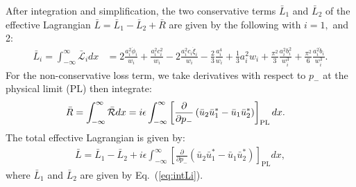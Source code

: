 After integration and simplification, the two conservative terms $\bar{L}_1$ and $\bar{L}_2$ of the effective Lagrangian $\bar{L} = \bar{L}_1 - \bar{L}_2 + \bar{R}$ are given by the following with $i=1,$ and 2:
\begin{align}
\bar{L}_i = \int_{-\infty}^{\infty} \bar{\mathcal{L}}_i dx &= 2\frac{a_i^2  \dot{\phi}_i}{w_i}+\frac{a_i^2 c_i^2}{w_i} - 2 \frac{a_i^2 c_i \dot{\xi}_i}{w_i} - \frac{2}{3} \frac{a_i^4}{w_i} +\frac{1}{3} a_i^2 w_i + \frac{\pi^2}{3} \frac{ a_i^2 b_i^2}{w_i^3} + \frac{\pi^2}{6} \frac{a_i^2 \dot{b}_i}{w_i^3}. \label{eq:intLi} 
\end{align}
For the non-conservative loss term, we take derivatives with respect to $p_-$ at the physical limit ($\mathrm{PL}$) then integrate:
\begin{align}
\bar{R} = \int_{-\infty}^{\infty} \bar{\mathcal{R}} dx &=  i \epsilon \int_{-\infty}^{\infty} \left[ \frac{\partial}{\partial p_-} \left( \bar{u}_2 \bar{u}_1^* - \bar{u}_1\bar{u}_2^* \right) \right]_{\rm PL} dx.
\end{align}
The total effective Lagrangian is given by:
\begin{align}
\bar{L} = \bar{L}_1 - \bar{L}_2 + i \epsilon \int_{-\infty}^{\infty} \left[ \frac{\partial}{\partial p_-} \left( \bar{u}_2 \bar{u}_1^* - \bar{u}_1\bar{u}_2^* \right)\right]_{\mathrm{PL}} dx, 
\end{align}
where $\bar{L}_1$ and $\bar{L}_2$ are given by Eq.~(\ref{eq:intLi}).
